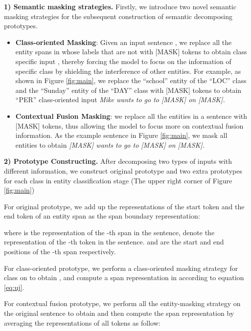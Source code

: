 \documentclass[sigconf,natbib=true,anonymous=False]{acmart}
\begin{document}
\textbf{1) Semantic masking strategies.} Firstly, we introduce two novel semantic masking strategies for the subsequent construction of semantic decomposing prototypes.

\begin{itemize}
\item {\textbf{Class-oriented Masking}}: Given an input sentence , we replace all the entity spans in  whose labels that are not  with [MASK] tokens to obtain class  specific input , thereby forcing the model to focus on the information of specific class by shielding the interference of other entities. For example, as shown in Figure \ref{fig:main}, we replace the “school” entity of the “LOC” class and the “Sunday” entity of the “DAY” class with [MASK] tokens to obtain “PER” class-oriented input\textit{ Mike wants to go to [MASK] on [MASK]. }

\item {\textbf{Contextual Fusion Masking}}: we replace all the entities in a sentence with [MASK] tokens, thus allowing the model to focus more on contextual fusion information. As the example sentence in Figure \ref{fig:main}, we mask all entities to obtain  \textit{[MASK] wants to go to [MASK] on [MASK].}
\end{itemize}


 






\textbf{2) Prototype Constructing.} After decomposing two types of inputs with different information, we construct original prototype and two extra prototypes for each class in entity classification stage (The upper right corner of Figure \ref{fig:main})

For original prototype, we add up the representations of the start token and the end token of an entity span as the span boundary representation:

where  is the representation of the -th span in the sentence,  denote the representation of the -th token in the sentence.  and  are the start and end positions of the -th span respectively.

For class-oriented prototype, we perform a class-oriented masking strategy for class  on  to obtain , and compute a span representation  in  according to equation \ref{eq:uj}. 

For contextual fusion prototype, we perform all the entity-masking strategy on the original sentence  to obtain  and then compute the span representation  by averaging the representations of all tokens as follow:
\end{document}
